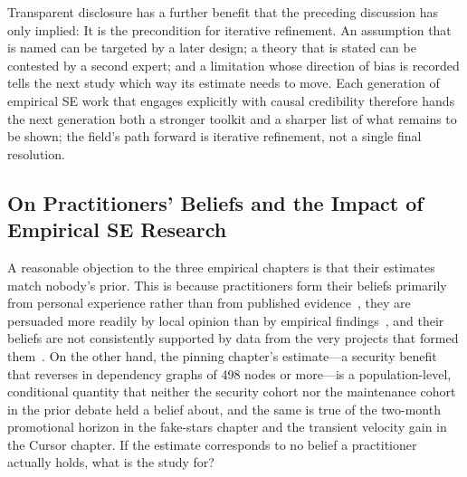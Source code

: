 Transparent disclosure has a further benefit that the preceding discussion has only implied: It is the precondition for iterative refinement.
An assumption that is named can be targeted by a later design; a theory that is stated can be contested by a second expert; and a limitation whose direction of bias is recorded tells the next study which way its estimate needs to move.
Each generation of empirical SE work that engages explicitly with causal credibility therefore hands the next generation both a stronger toolkit and a sharper list of what remains to be shown; the field's path forward is iterative refinement, not a single final resolution.

\subsection{On Practitioners' Beliefs and the Impact of Empirical SE Research}
\label{sec:conclusion-practitioner-beliefs}

A reasonable objection to the three empirical chapters is that their estimates match nobody's prior.
This is because practitioners form their beliefs primarily from personal experience rather than from published evidence~\cite{DBLP:conf/icse/Devanbu0B16, DBLP:conf/esem/PassosBCM11}, they are persuaded more readily by local opinion than by empirical findings~\cite{DBLP:conf/isese/RainerHB03}, and their beliefs are not consistently supported by data from the very projects that formed them~\cite{DBLP:journals/ese/ShrikanthNFM21}.
On the other hand, the pinning chapter's estimate---a security benefit that reverses in dependency graphs of 498 nodes or more---is a population-level, conditional quantity that neither the security cohort nor the maintenance cohort in the prior debate held a belief about, and the same is true of the two-month promotional horizon in the fake-stars chapter and the transient velocity gain in the Cursor chapter.
If the estimate corresponds to no belief a practitioner actually holds, what is the study for?

